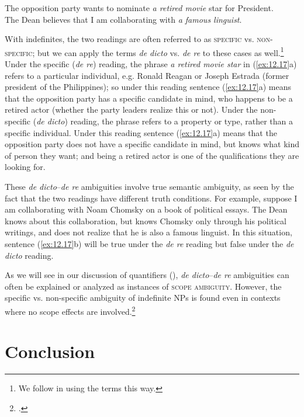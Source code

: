 \ea \label{ex:12.17}
\ea The opposition party wants to nominate \textit{a retired movie} star for President.\\
\ex The Dean believes that I am collaborating with \textit{a famous linguist}.
                       \z
\z


With indefinites, the two readings are often referred to as \textsc{specific} vs. \textsc{non-specific}; but we can apply the terms \textit{de dicto} vs. \textit{de re} to these cases as well.\footnote{We follow  \citet{vonHeusinger2011} in using the terms this way.} Under the specific (\textit{de re}) reading, the phrase \textit{a retired movie star} in (\ref{ex:12.17}a) refers to a particular individual, e.g. Ronald Reagan or Joseph Estrada (former president of the Philippines); so under this reading sentence (\ref{ex:12.17}a) means that the opposition party has a specific candidate in mind, who happens to be a retired actor (whether the party leaders realize this or not). Under the non-specific (\textit{de dicto}) reading, the phrase refers to a property or type, rather than a specific individual. Under this reading sentence (\ref{ex:12.17}a) means that the opposition party does not have a specific candidate in mind, but knows what kind of person they want; and being a retired actor is one of the qualifications they are looking for.



These \textit{de dicto}–\textit{de re} ambiguities involve true semantic ambiguity, as seen by the fact that the two readings have different truth conditions. For example, suppose I am collaborating with Noam Chomsky on a book of political essays. The Dean knows about this collaboration, but knows Chomsky only through his political writings, and does not realize that he is also a famous linguist. In this situation, sentence (\ref{ex:12.17}b) will be true under the \textit{de re} reading but false under the \textit{de dicto} reading.



As we will see in our discussion of quantifiers (), \textit{de dicto}–\textit{de re} ambiguities can often be explained or analyzed as instances of \textsc{scope ambiguity}. However, the specific vs. non-specific ambiguity of indefinite NPs is found even in contexts where no scope effects are involved.\footnote{\citet{FodorSag1982}.}


\section{Conclusion}\label{sec:12.6}

